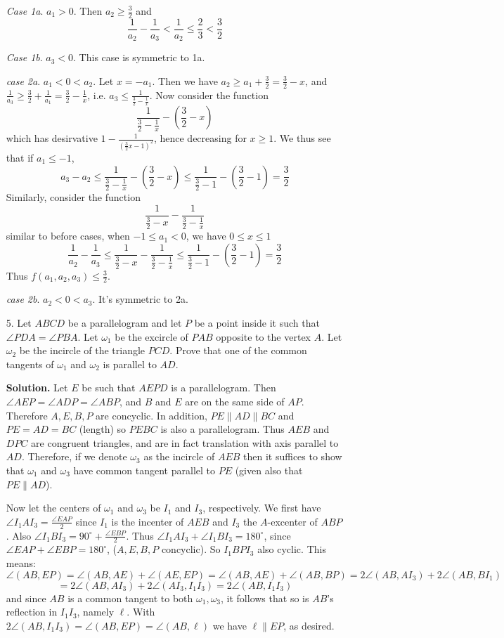 \documentclass[11pt,a4paper]{article}
\begin{document}
\begin{enumerate}
	\emph{Case 1a}. $a_1> 0$. 
	Then $a_2\ge \frac 32$ and 
	\[
	\frac{1}{a_2}-\frac{1}{a_3}< \frac{1}{a_2} \le \frac{2}{3}<\frac 32
	\]
	
	\emph{Case 1b}. $a_3< 0$. 
	This case is symmetric to 1a. 
	
	\emph{case 2a}. $a_1<0<a_2$. 
	Let $x=-a_1$. 
	Then we have $a_2\ge a_1+\frac 32 = \frac 32 - x$, 
	and $\frac{1}{a_3}\ge \frac 32 +\frac{1}{a_1}=\frac 32-\frac 1x$, i.e. 
	$a_3\le \frac{1}{\frac 32-\frac 1x}$. 
	Now consider the function 
	\[
	\frac{1}{\frac 32-\frac 1x} - (\frac 32 - x)
	\]
	which has desirvative $1-\frac{1}{(\frac 32x-1)^2}$, hence decreasing for $x\ge 1$. 
	We thus see that if $a_1\le -1$, 
	\[
	a_3-a_2\le \frac{1}{\frac 32-\frac 1x} - (\frac 32 - x)\le 
	\frac{1}{\frac 32-1} - (\frac 32 - 1) = \frac 32
	\] 
	Similarly, consider the function 
	\[
	\frac{1}{\frac 32 - x} - \frac{1}{\frac 32- \frac{1}{x}}
	\]
	similar to before cases, when $-1\le a_1<0$, we have $0\le x\le 1$
	\[
	\frac{1}{a_2}-\frac{1}{a_3}
	\le \frac{1}{\frac 32 - x} - \frac{1}{\frac 32- \frac{1}{x}}
	\le \frac{1}{\frac 32-1} - (\frac 32 - 1) = \frac 32
	\]
	Thus $f(a_1, a_2, a_3)\le \frac 32$. 
	
	\emph{case 2b}. $a_2<0<a_3$. It's symmetric to 2a. 
	
	\item[5.]
	Let $ABCD$ be a parallelogram and let $P$ be a point inside it such that $\angle P DA = \angle P BA$.
	Let $\omega_1$ be the excircle of $P AB$ opposite to the vertex $A$. Let $\omega_2$ be the incircle of the
	triangle $PCD$. Prove that one of the common tangents of $\omega_1$ and $\omega_2$ is parallel to $AD$.
	
	\textbf{Solution.} 
	Let $E$ be such that $AEPD$ is a parallelogram. 
	Then $\angle AEP=\angle ADP=\angle ABP$, and $B$ and $E$ are on the same side of $AP$. 
	Therefore $A, E, B, P$ are concyclic. 
	In addition, $PE\parallel AD\parallel BC$ and $PE=AD=BC$ (length) so $PEBC$ is also a parallelogram. 
	Thus $AEB$ and $DPC$ are congruent triangles, 
	and are in fact translation with axis parallel to $AD$. 
	Therefore, if we denote $\omega_3$ as the incircle of $AEB$ then it suffices to show that $\omega_1$ and $\omega_3$ have common tangent parallel to $PE$ (given also that $PE\parallel AD$). 
	
	Now let the centers of $\omega_1$ and $\omega_3$ be $I_1$ and $I_3$, respectively. 
	We first have $\angle I_1AI_3=\frac{\angle EAP}{2}$ 
	since $I_1$ is the incenter of $AEB$ and $I_3$ the $A$-excenter of $ABP$. 
	Also $\angle I_1BI_3=90^{\circ}+\frac{\angle EBP}{2}$. 
	Thus $\angle I_1AI_3+\angle I_1BI_3=180^{\circ}$, 
	since $\angle EAP+\angle EBP=180^{\circ}$, 
	($A, E, B, P$ concyclic). 
	So $I_1BPI_3$ also cyclic. This means: 
	\[
	\angle(AB, EP)
	=\angle(AB, AE)+\angle(AE, EP)
	=\angle(AB, AE)+\angle(AB, BP)
	=2\angle(AB, AI_3)+2\angle(AB, BI_1)
	\]\[
	=2\angle(AB, AI_3)+2\angle(AI_3, I_1I_3)
	=2\angle(AB, I_1I_3)
	\]
	and since $AB$ is a common tangent to both $\omega_1, \omega_3$, it follows that so is $AB$'s reflection in $I_1I_3$, namely $\ell$. 
	With $2\angle(AB, I_1I_3)=\angle(AB, EP)=\angle(AB, \ell)$ we have $\ell\parallel EP$, as desired. 
	
\end{enumerate}
\end{document}
